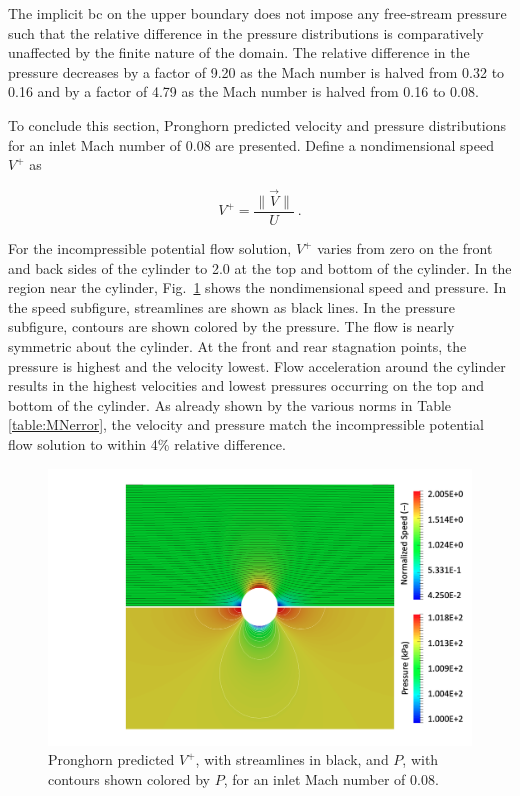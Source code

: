 The implicit \gls{bc} on the upper boundary does not impose any free-stream pressure such that the relative difference in the pressure distributions is comparatively unaffected by the finite nature of the domain. The relative difference in the pressure decreases by a factor of 9.20 as the Mach number is halved from 0.32 to 0.16 and by a factor of 4.79 as the Mach number is halved from 0.16 to 0.08.

To conclude this section, Pronghorn predicted velocity and pressure distributions for an inlet Mach number of 0.08 are presented. Define a nondimensional speed \(V^+\) as

\begin{equation}
V^+=\frac{\|\vec{V}\|}{U}\ .
\end{equation}

\noindent For the incompressible potential flow solution, \(V^+\) varies from zero on the front and back sides of the cylinder to 2.0 at the top and bottom of the cylinder. In the region near the cylinder, Fig.\ \ref{fig:Ma08} shows the nondimensional speed and pressure. In the speed subfigure, streamlines are shown as black lines. In the pressure subfigure, contours are shown colored by the pressure. The flow is nearly symmetric about the cylinder. At the front and rear stagnation points, the pressure is highest and the velocity lowest. Flow acceleration around the cylinder results in the highest velocities and lowest pressures occurring on the top and bottom of the cylinder. As already shown by the various norms in Table \ref{table:MNerror}, the velocity and pressure match the incompressible potential flow solution to within 4\% relative difference.

\begin{figure}[!h]
  \centering
  \includegraphics[width=0.7\linewidth]{figs/pf_Ma08.png}
  \caption{Pronghorn predicted \(V^+\), with streamlines in black, and \(P\), with contours shown colored by \(P\), for an inlet Mach number of 0.08.}
  \label{fig:Ma08}
\end{figure}

